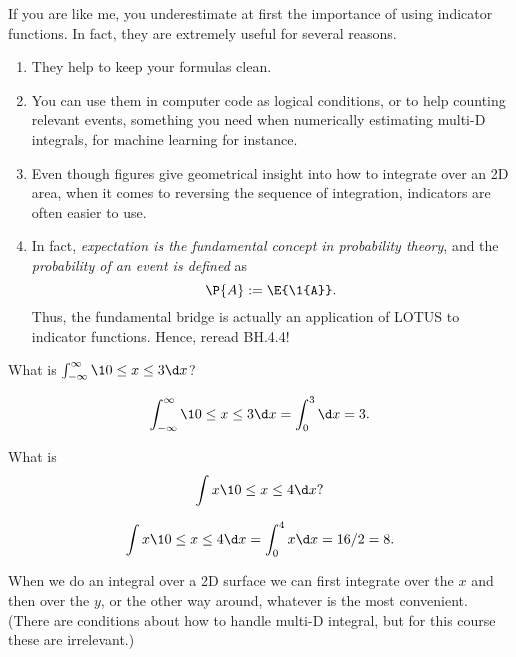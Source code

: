 \begin{remark}
If you are like me, you underestimate at first the importance of using indicator functions. In fact, they are extremely useful for several reasons.
\begin{enumerate}
\item  They help to keep your formulas clean.
\item You can use them in computer code as logical conditions, or to help counting relevant events, something you need when numerically estimating multi-D integrals,  for machine learning for instance.
\item  Even though figures give geometrical insight into how to integrate over an 2D area, when it comes to reversing the sequence of integration, indicators are often easier to use.
\item In fact, \emph{expectation is the fundamental concept in probability theory}, and the \emph{probability of an event is defined} as
\begin{equation}
  \label{eq:84}
  \P{A} := \E{\1{A}}.
\end{equation}
Thus, the fundamental bridge is actually an application of LOTUS to indicator functions. Hence, reread BH.4.4!
\end{enumerate}
\end{remark}

\begin{exercise}
What is $\int_{-\infty}^{\infty} \1{0\leq x \leq 3} \d x$?
\begin{solution}
\begin{align*}
\int_{-\infty}^{\infty} \1{0\leq x \leq 3} \d x =\int_{0}^{3}  \d x  = 3.
\end{align*}
\end{solution}
\end{exercise}

\begin{exercise}
What is
\begin{equation}
\label{eq:85}
\int x \1{0\leq x \leq 4} \d x?
\end{equation}
\begin{solution}
\begin{align*}
\int x \1{0\leq x \leq 4} \d x  = \int_{0}^{4} x \d x = 16/2 = 8.
\end{align*}
\end{solution}
\end{exercise}

When we do an integral over a 2D surface we can first integrate over the $x$ and then over the $y$, or the other way around, whatever is the most convenient.
(There are conditions about how to handle multi-D integral, but for this course these are irrelevant.)

